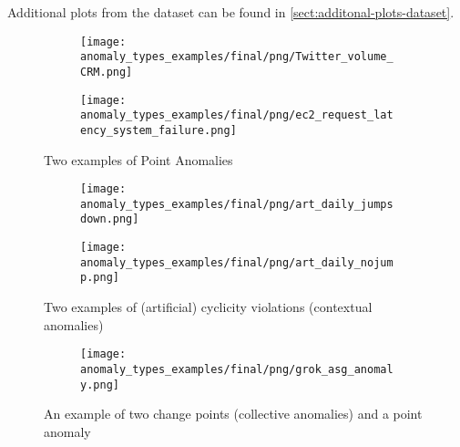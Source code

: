 Additional plots from the dataset can be found in \cref{sect:additonal-plots-dataset}.

\begin{figure}[htp!]
    \centering
    \begin{subfigure}[t]{.49\linewidth}
        \centering
        \texttt{[image: anomaly\_types\_examples/final/png/Twitter\_volume\_CRM.png]}
    \end{subfigure}
    \begin{subfigure}[t]{.49\linewidth}
        \centering
        \texttt{[image: anomaly\_types\_examples/final/png/ec2\_request\_latency\_system\_failure.png]}
    \end{subfigure}
    \caption{Two examples of Point Anomalies}\label{fig:point-anomalies-nab}
\end{figure}

\begin{figure}[htp!]
    \centering
    \begin{subfigure}[t]{.49\linewidth}
        \centering
        \texttt{[image: anomaly\_types\_examples/final/png/art\_daily\_jumpsdown.png]}
    \end{subfigure}
    \begin{subfigure}[t]{.49\linewidth}
        \centering
        \texttt{[image: anomaly\_types\_examples/final/png/art\_daily\_nojump.png]}
    \end{subfigure}
    \caption{Two examples of (artificial) cyclicity violations (contextual anomalies)}\label{fig:contextual-anomalies-nab}
\end{figure}

\begin{figure}[htp!]
    \centering
    \begin{subfigure}[t]{.49\linewidth}
        \centering
        \texttt{[image: anomaly\_types\_examples/final/png/grok\_asg\_anomaly.png]}
    \end{subfigure}
    \caption{An example of two change points (collective anomalies) and a point anomaly}\label{fig:collective-anomalies-nab}
\end{figure}
\clearpage


